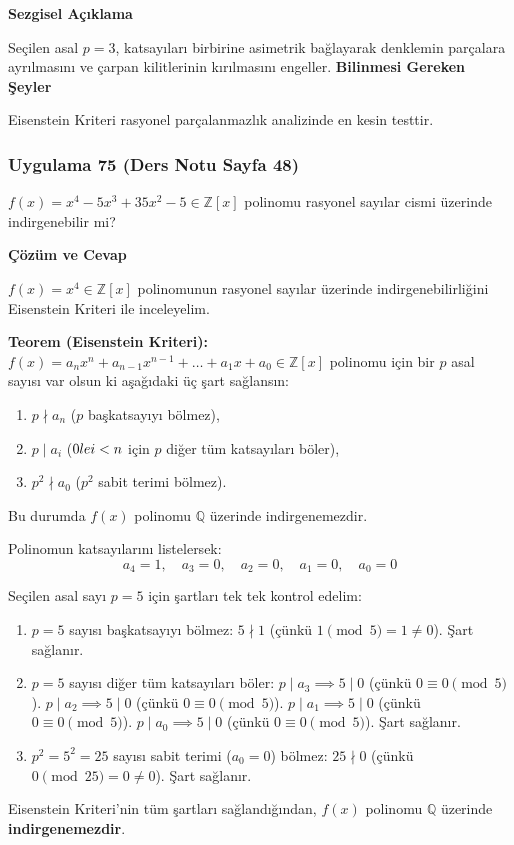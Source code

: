 \documentclass[11pt, a4paper]{article}
\newenvironment{cozum}{
    \vspace{0.5cm}
    \noindent\textcolor{green!60!black}{\faCheckCircle\enspace \textbf{\Large Çözüm ve Cevap}}\par\vspace{0.2cm}
}{}
\newenvironment{sezgisel}{
    \vspace{0.5cm}
    \noindent\textcolor{orange!80!black}{\faLightbulb\enspace \textbf{\Large Sezgisel Açıklama}}\par\vspace{0.2cm}
    \itshape
}{}
\newenvironment{bilgi}{
    \vspace{0.5cm}
    \noindent\textcolor{red!70!black}{\faExclamationTriangle\enspace \textbf{\Large Bilinmesi Gereken Şeyler}}\par\vspace{0.2cm}
}{}
\begin{document}
\begin{sezgisel}
Seçilen asal $p=3$, katsayıları birbirine asimetrik bağlayarak denklemin parçalara ayrılmasını ve çarpan kilitlerinin kırılmasını engeller.
\end{sezgisel}
\begin{bilgi}
Eisenstein Kriteri rasyonel parçalanmazlık analizinde en kesin testtir.
\end{bilgi}

\newpage
\subsubsection{Uygulama 75 (Ders Notu Sayfa 48)}
\begin{sorubox}
$f(x) = x^4 - 5x^3 + 35x^2 - 5 \in \mathbb{Z}[x]$ polinomu rasyonel sayılar cismi üzerinde indirgenebilir mi?
\end{sorubox}
\begin{cozum}
$f(x) = x^{4} \in \mathbb{Z}[x]$ polinomunun rasyonel sayılar üzerinde indirgenebilirliğini Eisenstein Kriteri ile inceleyelim.

\textbf{Teorem (Eisenstein Kriteri):} $f(x) = a_n x^n + a_{n-1} x^{n-1} + \dots + a_1 x + a_0 \in \mathbb{Z}[x]$ polinomu için bir $p$ asal sayısı var olsun ki aşağıdaki üç şart sağlansın:
\begin{enumerate}
    \item $p \nmid a_n$ ($p$ başkatsayıyı bölmez),
    \item $p \mid a_i$ ($0 \\le i < n$ için $p$ diğer tüm katsayıları böler),
    \item $p^2 \nmid a_0$ ($p^2$ sabit terimi bölmez).
\end{enumerate}
Bu durumda $f(x)$ polinomu $\mathbb{Q}$ üzerinde indirgenemezdir.

Polinomun katsayılarını listelersek:
\[ a_{4} = 1, \quad a_{3} = 0, \quad a_{2} = 0, \quad a_{1} = 0, \quad a_{0} = 0 \]

Seçilen asal sayı $p = 5$ için şartları tek tek kontrol edelim:
\begin{enumerate}
    \item $p = 5$ sayısı başkatsayıyı bölmez: $5 \nmid 1$ (çünkü $1 \pmod{5} = 1 \neq 0$). Şart sağlanır.
    \item $p = 5$ sayısı diğer tüm katsayıları böler:
    $p \mid a_{3} \implies 5 \mid 0$ (çünkü $0 \equiv 0 \pmod{5}$).
    $p \mid a_{2} \implies 5 \mid 0$ (çünkü $0 \equiv 0 \pmod{5}$).
    $p \mid a_{1} \implies 5 \mid 0$ (çünkü $0 \equiv 0 \pmod{5}$).
    $p \mid a_{0} \implies 5 \mid 0$ (çünkü $0 \equiv 0 \pmod{5}$).
    Şart sağlanır.
    \item $p^2 = 5^2 = 25$ sayısı sabit terimi ($a_0 = 0$) bölmez: $25 \nmid 0$ (çünkü $0 \pmod{25} = 0 \neq 0$). Şart sağlanır.
\end{enumerate}

Eisenstein Kriteri'nin tüm şartları sağlandığından, $f(x)$ polinomu $\mathbb{Q}$ üzerinde \textbf{indirgenemezdir}.
\end{cozum}
\end{document}
